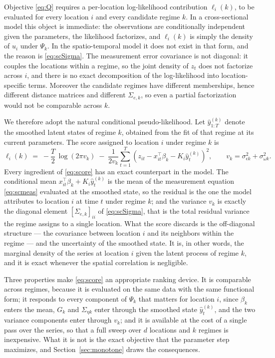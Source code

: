 Objective \eqref{eq:Q} requires a per-location log-likelihood contribution $\ell_i(k)$, to be evaluated for every location $i$ and every candidate regime $k$. In a cross-sectional model this object is immediate: the observations are conditionally independent given the parameters, the likelihood factorizes, and $\ell_i(k)$ is simply the density of $u_i$ under $\Psi_k$. In the spatio-temporal model it does not exist in that form, and the reason is \eqref{eq:scSigma}. The measurement error covariance is not diagonal: it couples the locations within a regime, so the joint density of $z_t$ does not factorize across $i$, and there is no exact decomposition of the log-likelihood into location-specific terms. Moreover the candidate regimes have different memberships, hence different distance matrices and different $\Sigma_{e,k}$, so even a partial factorization would not be comparable across $k$.

We therefore adopt the natural conditional pseudo-likelihood. Let $\hat{y}^{(k)}_{1:T}$ denote the smoothed latent states of regime $k$, obtained from the fit of that regime at its current parameters. The score assigned to location $i$ under regime $k$ is
\begin{equation}\label{eq:score}
  \ell_i(k) \;=\; -\frac{T}{2}\,\log\!\left(2\pi v_k\right)
  \;-\; \frac{1}{2 v_k} \sum_{t=1}^{T}
        \left(z_{it} - x_{it}^\top \beta_k - K_i \hat{y}^{(k)}_t\right)^{2},
  \qquad v_k = \sigma^2_{\epsilon k} + \sigma^2_{\omega k}.
\end{equation}
Every ingredient of \eqref{eq:score} has an exact counterpart in the model. The conditional mean $x_{it}^\top \beta_k + K_i \hat{y}^{(k)}_t$ is the mean of the measurement equation \eqref{eq:scmeas} evaluated at the smoothed state, so the residual is the one the model attributes to location $i$ at time $t$ under regime $k$; and the variance $v_k$ is exactly the diagonal element $[\Sigma_{e,k}]_{ii}$ of \eqref{eq:scSigma}, that is the total residual variance the regime assigns to a single location. What the score discards is the off-diagonal structure --- the covariance between location $i$ and its neighbors within the regime --- and the uncertainty of the smoothed state. It is, in other words, the marginal density of the series at location $i$ given the latent process of regime $k$, and it is exact whenever the spatial correlation is negligible.

Three properties make \eqref{eq:score} an appropriate ranking device. It is comparable across regimes, because it is evaluated on the same data with the same functional form; it responds to every component of $\Psi_k$ that matters for location $i$, since $\beta_k$ enters the mean, $G_k$ and $\Sigma_{\eta k}$ enter through the smoothed state $\hat{y}^{(k)}_t$, and the two variance components enter through $v_k$; and it is available at the cost of a single pass over the series, so that a full sweep over $d$ locations and $k$ regimes is inexpensive. What it is not is the exact objective that the parameter step maximizes, and Section~\ref{sec:monotone} draws the consequences.


